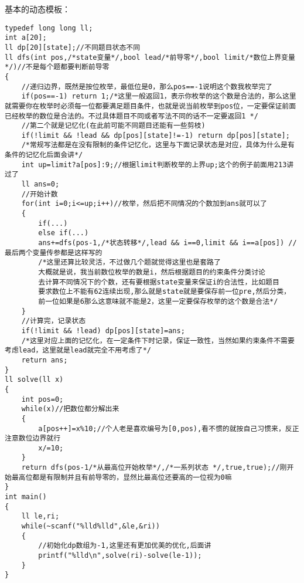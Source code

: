 	基本的动态模板：
	\begin{verbatim}
typedef long long ll;  
int a[20];  
ll dp[20][state];//不同题目状态不同  
ll dfs(int pos,/*state变量*/,bool lead/*前导零*/,bool limit/*数位上界变量*/)//不是每个题都要判断前导零  
{  
    //递归边界，既然是按位枚举，最低位是0，那么pos==-1说明这个数我枚举完了  
    if(pos==-1) return 1;/*这里一般返回1，表示你枚举的这个数是合法的，那么这里就需要你在枚举时必须每一位都要满足题目条件，也就是说当前枚举到pos位，一定要保证前面已经枚举的数位是合法的。不过具体题目不同或者写法不同的话不一定要返回1 */  
    //第二个就是记忆化(在此前可能不同题目还能有一些剪枝)  
    if(!limit && !lead && dp[pos][state]!=-1) return dp[pos][state];  
    /*常规写法都是在没有限制的条件记忆化，这里与下面记录状态是对应，具体为什么是有条件的记忆化后面会讲*/  
    int up=limit?a[pos]:9;//根据limit判断枚举的上界up;这个的例子前面用213讲过了  
    ll ans=0;  
    //开始计数  
    for(int i=0;i<=up;i++)//枚举，然后把不同情况的个数加到ans就可以了  
    {  
        if(...)
        else if(...)  
        ans+=dfs(pos-1,/*状态转移*/,lead && i==0,limit && i==a[pos]) //最后两个变量传参都是这样写的  
        /*这里还算比较灵活，不过做几个题就觉得这里也是套路了 
        大概就是说，我当前数位枚举的数是i，然后根据题目的约束条件分类讨论 
        去计算不同情况下的个数，还有要根据state变量来保证i的合法性，比如题目 
        要求数位上不能有62连续出现,那么就是state就是要保存前一位pre,然后分类， 
        前一位如果是6那么这意味就不能是2，这里一定要保存枚举的这个数是合法*/  
    }  
    //计算完，记录状态  
    if(!limit && !lead) dp[pos][state]=ans;  
    /*这里对应上面的记忆化，在一定条件下时记录，保证一致性，当然如果约束条件不需要考虑lead，这里就是lead就完全不用考虑了*/  
    return ans;  
}  
ll solve(ll x)  
{  
    int pos=0;  
    while(x)//把数位都分解出来  
    {  
        a[pos++]=x%10;//个人老是喜欢编号为[0,pos),看不惯的就按自己习惯来，反正注意数位边界就行  
        x/=10;  
    }  
    return dfs(pos-1/*从最高位开始枚举*/,/*一系列状态 */,true,true);//刚开始最高位都是有限制并且有前导零的，显然比最高位还要高的一位视为0嘛  
}  
int main()  
{  
    ll le,ri;  
    while(~scanf("%lld%lld",&le,&ri))  
    {  
        //初始化dp数组为-1,这里还有更加优美的优化,后面讲  
        printf("%lld\n",solve(ri)-solve(le-1));  
    }  
}  
\end{verbatim}

